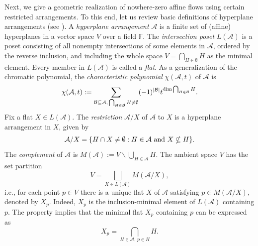 \documentclass[12pt]{article}%
\renewcommand*{\bm}[1]{#1}%
\numberwithin{equation}{section}
\def\And{\mbox{\rm ~and~}}
\begin{document}
Next, we give a geometric realization of nowhere-zero affine flows using certain restricted arrangements. To this end, let us review basic definitions of hyperplane arrangements (see \cite{Stanley2007}). A {\em hyperplane arrangement} $\mathcal{A}$ is a finite set of (affine) hyperplanes in a vector space $V$ over a field $\mathbb{F}$. The {\em intersection poset} $L(\mathcal{A})$ is a poset consisting of all nonempty intersections of some  elements in $\mathcal{A}$, ordered by the reverse inclusion, and including the whole space $V=\bigcap_{H\in\emptyset}H$ as the minimal element. Every member in $L(\mathcal{A})$ is called a {\em flat}. As a generalization of the chromatic polynomial, the {\em characteristic polynomial} $\chi(\mathcal{A},t)$ of $\mathcal{A}$ is 
\[
\chi(\mathcal{A},t):=\sum_{\mathcal{B}\subseteq \mathcal{A},\,\bigcap_{H\in\mathcal{B}}H\ne\emptyset}(-1)^{|\mathcal{B}|}t^{{\rm dim}\bigcap_{H\in\mathcal{B}}H}.
\]
Fix a flat $X\in L(\mathcal{A})$. The {\em restriction} $\mathcal{A}/X$ of $\mathcal{A}$ to $X$ is a hyperplane arrangement in $X$, given by
\[
\mathcal{A}/X=\{H\cap X\ne\emptyset: H\in \mathcal{A}\And X\nsubseteq H\}.
\]
The {\em complement} of $\mathcal{A}$ is  $M(\mathcal{A}):=V\smallsetminus \bigcup_{H\in \mathcal{A}}H$. The ambient space $V$ has the set partition
\begin{equation}\label{DA}
V=\bigsqcup_{X\in L(\mathcal{A})}M(\mathcal{A}/X),
\end{equation}
i.e., for each point $\bm p\in V$ there is a unique flat $X$ of $\mathcal{A}$ satisfying $\bm p\in M(\mathcal{A}/X)$, denoted by $X_{\bm p}$. Indeed, $X_{\bm p}$ is the inclusion-minimal element of $L(\mathcal{A})$ containing $\bm p$. The property implies that the minimal flat $X_{\bm p}$ containing $\bm p$ can be expressed as
\begin{equation}\label{Flat}
X_{\bm p}=\bigcap_{H\in\mathcal{A},\, \bm p\in H}H.
\end{equation}
\end{document}
